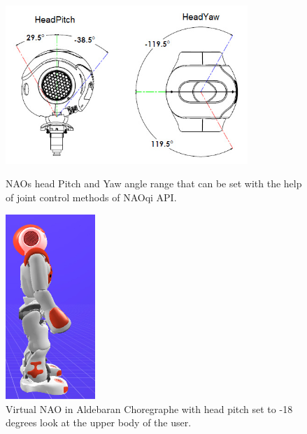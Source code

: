 \begin{figure}	 	
	\begin{minipage}
		{.6
		\textwidth}  	
		\includegraphics[height=60mm]{figures/content/nao-head.jpg} \caption{NAOs head Pitch and Yaw angle range that can be set with the help of joint control methods of NAOqi API. \cite{nao-spec} } \label{fg:nao:head} 
	\end{minipage}
	\hspace{10 mm}
	\begin{minipage}
		{.3
		\textwidth}  
		\centering
		\includegraphics[height=70mm]{figures/content/nao-head-stand.jpg} \caption{Virtual NAO in Aldebaran Choregraphe with head pitch set to -18 degrees look at the upper body of the user.} \label{fg:nao:head:stand} 
	\end{minipage}	
\end{figure}



